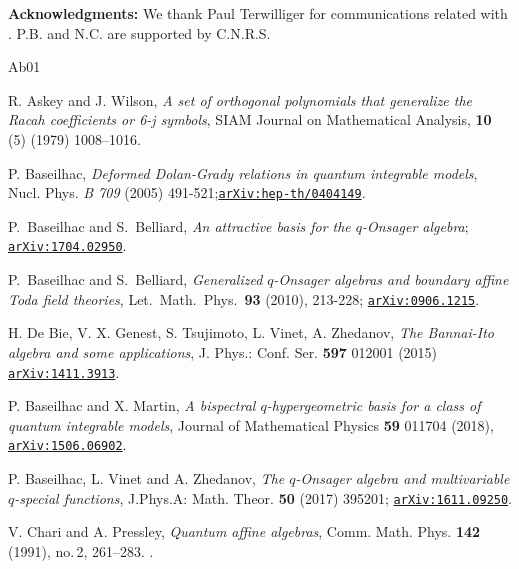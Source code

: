 \documentclass[11pt]{amsart}
\numberwithin{equation}{section}
\numberwithin{equation}{section}
\begin{document}
\vspace{5mm}


\noindent
{\bf Acknowledgments:} We thank Paul Terwilliger for communications related with \cite{IT10}.
P.B. and N.C.  are supported by C.N.R.S.  

\vspace{0.15cm} 




\begin{thebibliography}{Ab01}	

  R. Askey and J. Wilson, {\it A set of orthogonal polynomials that generalize the Racah coefficients or 6-j symbols}, SIAM Journal on Mathematical Analysis, {\bf 10} (5) (1979) 1008–1016.


P. Baseilhac, {\it Deformed Dolan-Grady relations in quantum integrable models}, Nucl. Phys. {\it B 709} (2005) 491-521;\href{https://arxiv.org/abs/hep-th/0404149} {\tt arXiv:hep-th/0404149}.


P.\ Baseilhac and S.\ Belliard, \textit{An attractive basis for the $q$-Onsager algebra}; 
\href{https://arxiv.org/abs/1704.02950}{\tt arXiv:1704.02950}.

P.\ Baseilhac and S.\ Belliard, {\it Generalized $q$-Onsager algebras and boundary affine Toda field theories}, Let.\ Math.\ Phys.\ {\bf 93} (2010), 213-228; \href{https://arxiv.org/abs/0906.1215} {\tt arXiv:0906.1215}.

H. De Bie, V. X. Genest, S. Tsujimoto, L. Vinet, A. Zhedanov, {\it The Bannai-Ito algebra and some applications}, J. Phys.: Conf. Ser. {\bf 597} 012001 (2015) 
\href{https://arxiv.org/abs/1411.3913}{\tt arXiv:1411.3913}.


P. Baseilhac and X. Martin, {\it A bispectral $q$-hypergeometric basis for a class of quantum
integrable models}, Journal of Mathematical Physics {\bf 59} 011704 (2018), \href{https://arxiv.org/abs/1506.06902} {\tt arXiv:1506.06902}.

 P. Baseilhac, L. Vinet and A. Zhedanov,
\textit{The $q$-Onsager algebra and multivariable $q$-special functions},
J.Phys.A: Math. Theor. {\bf 50} (2017) 395201; \href{https://arxiv.org/abs/1611.0925}{\texttt{arXiv:1611.09250}}.

V. Chari and A. Pressley, {\it Quantum affine algebras}, Comm. Math. Phys.
\textbf{142} (1991), no.\,2, 261--283. .




\end{thebibliography}
\end{document}
